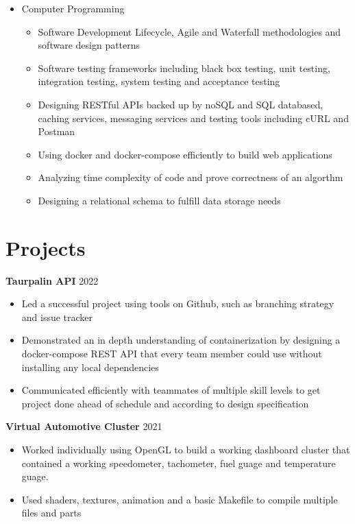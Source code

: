 \documentclass{article}
\begin{document}
\begin{itemize}
		\item Computer Programming
		\begin{itemize}
			\item Software Development Lifecycle, Agile and Waterfall methodologies and software design patterns
			\item Software testing frameworks including black box testing, unit testing, integration testing, system testing and acceptance testing
			\item Designing RESTful APIs backed up by noSQL and SQL databased, caching services, messaging services and testing tools including cURL and Postman
			\item Using docker and docker-compose efficiently to build web applications
			\item Analyzing time complexity of code and prove correctness of an algorthm 
			\item Designing a relational schema to fulfill data storage needs
		\end{itemize}

	\end{itemize}

	\section*{Projects}

	\noindent \textbf{Taurpalin API}
	{\hfill 2022}
	\begin{itemize}
		\item Led a successful project using tools on Github, such as branching strategy and issue tracker
		\item Demonstrated an in depth understanding of containerization by designing a docker-compose REST API that every team member could use without installing any local dependencies
		\item Communicated efficiently with teammates of multiple skill levels to get project done ahead of schedule and according to design specification
	\end{itemize}

	\newpage
	\noindent \textbf{Virtual Automotive Cluster}
	{\hfill 2021}
	\begin{itemize}
		\item Worked individually using OpenGL to build a working dashboard cluster that contained a working speedometer, tachometer, fuel guage and temperature guage.
		\item Used shaders, textures, animation and a basic Makefile to compile multiple files and parts
	\end{itemize}
\end{document}

